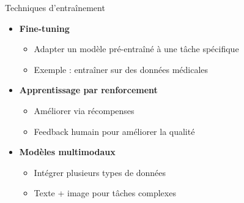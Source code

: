 \begin{frame}{Techniques d'entraînement}

\begin{itemize}
    \item<+-> \textbf{Fine-tuning}
        \begin{itemize}
            \item Adapter un modèle pré-entraîné à une tâche spécifique
            \item Exemple : entraîner sur des données médicales
        \end{itemize}

    \vspace{0.2cm}
    \item<+-> \textbf{Apprentissage par renforcement}
        \begin{itemize}
            \item Améliorer via récompenses
            \item Feedback humain pour améliorer la qualité
        \end{itemize}

    \vspace{0.2cm}
    \item<+-> \textbf{Modèles multimodaux}
        \begin{itemize}
            \item Intégrer plusieurs types de données
            \item Texte + image pour tâches complexes
        \end{itemize}
\end{itemize}

\end{frame}


